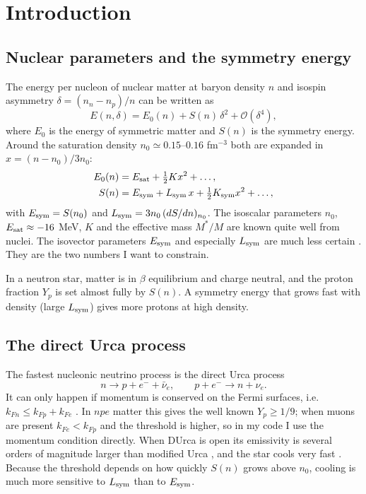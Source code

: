 \documentclass[11pt,a4paper]{article}
\newcommand{\Esym}{E_{\rm sym}}
\newcommand{\Lsym}{L_{\rm sym}}
\begin{document}
\tableofcontents
\newpage

\section{Introduction}

\subsection{Nuclear parameters and the symmetry energy}
The energy per nucleon of nuclear matter at baryon density $n$ and isospin asymmetry $\delta=(n_n-n_p)/n$ can be written as
\begin{equation}
E(n,\delta) = E_0(n) + S(n)\,\delta^2 + \mathcal{O}(\delta^4),
\end{equation}
where $E_0$ is the energy of symmetric matter and $S(n)$ is the symmetry energy. Around the saturation density $n_0\simeq 0.15$--$0.16$ fm$^{-3}$ both are expanded in $x=(n-n_0)/3n_0$:
\begin{align}
E_0(n) &= E_{\rm sat} + \tfrac12 K x^2 + \dots,\\
S(n) &= \Esym + \Lsym\, x + \tfrac12 K_{\rm sym}x^2 + \dots,
\end{align}
with $\Esym=S(n_0)$ and $\Lsym = 3n_0\,(dS/dn)_{n_0}$. The isoscalar parameters $n_0$, $E_{\rm sat}\approx-16$ MeV, $K$ and the effective mass $M^*/M$ are known quite well from nuclei. The isovector parameters $\Esym$ and especially $\Lsym$ are much less certain \cite{LattimerLim2013,Drischler2020,Essick2021}. They are the two numbers I want to constrain.

In a neutron star, matter is in $\beta$ equilibrium and charge neutral, and the proton fraction $Y_p$ is set almost fully by $S(n)$. A symmetry energy that grows fast with density (large $\Lsym$) gives more protons at high density.

\subsection{The direct Urca process}
The fastest nucleonic neutrino process is the direct Urca process
\begin{equation}
n\to p + e^- + \bar\nu_e,\qquad p + e^- \to n + \nu_e .
\end{equation}
It can only happen if momentum is conserved on the Fermi surfaces, i.e.\ $k_{Fn}\le k_{Fp}+k_{Fe}$ \cite{LPPH1991}. In $npe$ matter this gives the well known $Y_p\ge1/9$; when muons are present $k_{Fe}<k_{Fp}$ and the threshold is higher, so in my code I use the momentum condition directly. When DUrca is open its emissivity is several orders of magnitude larger than modified Urca \cite{FrimanMaxwell1979,Yakovlev2001}, and the star cools very fast \cite{YakovlevPethick2004,Page2004}. Because the threshold depends on how quickly $S(n)$ grows above $n_0$, cooling is much more sensitive to $\Lsym$ than to $\Esym$.
\end{document}
